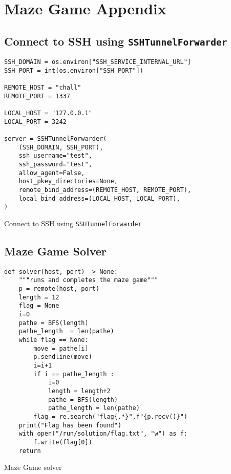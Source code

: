 \section{Maze Game Appendix}

\subsection{Connect to SSH using \texttt{SSHTunnelForwarder}}\label{apx:SSHTunnelForwarder_maze}

\begin{verbatim}
SSH_DOMAIN = os.environ["SSH_SERVICE_INTERNAL_URL"]
SSH_PORT = int(os.environ["SSH_PORT"])

REMOTE_HOST = "chall"
REMOTE_PORT = 1337

LOCAL_HOST = "127.0.0.1"
LOCAL_PORT = 3242

server = SSHTunnelForwarder(
    (SSH_DOMAIN, SSH_PORT),
    ssh_username="test",
    ssh_password="test",
    allow_agent=False,
    host_pkey_directories=None, 
    remote_bind_address=(REMOTE_HOST, REMOTE_PORT),
    local_bind_address=(LOCAL_HOST, LOCAL_PORT),
)
\end{verbatim}
\begin{listing}[H]
    \caption{Connect to SSH using \texttt{SSHTunnelForwarder}}
    \label{lst:SSHTunnelForwarder_maze}
\end{listing}

\subsection{Maze Game Solver}\label{apx:maze-solver}

\begin{verbatim}
def solver(host, port) -> None:
    """runs and completes the maze game"""
    p = remote(host, port)
    length = 12
    flag = None
    i=0
    pathe = BFS(length)
    pathe_length  = len(pathe)
    while flag == None:
        move = pathe[i]
        p.sendline(move)
        i=i+1
        if i == pathe_length :
            i=0 
            length = length+2
            pathe = BFS(length)
            pathe_length = len(pathe)
        flag = re.search("flag{.*}",f"{p.recv()}")
    print("Flag has been found")
    with open("/run/solution/flag.txt", "w") as f:
        f.write(flag[0])
    return
\end{verbatim}
\begin{listing}[H]
    \caption{Maze Game solver}
    \label{lst:maze-solver}
\end{listing}